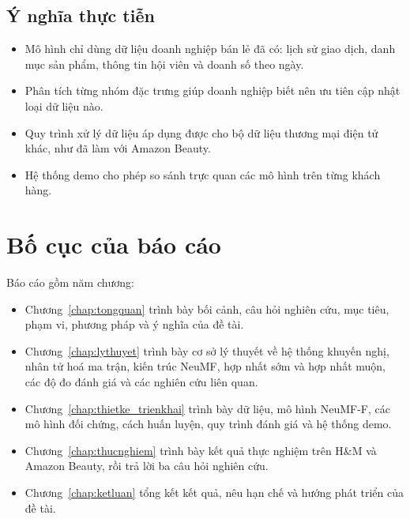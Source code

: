 \subsection{Ý nghĩa thực tiễn}
\label{subsec:ynghia_thucte}

\begin{itemize}
    \item Mô hình chỉ dùng dữ liệu doanh nghiệp bán lẻ đã có: lịch sử giao dịch, danh mục sản phẩm, thông tin hội viên và doanh số theo ngày.
    \item Phân tích từng nhóm đặc trưng giúp doanh nghiệp biết nên ưu tiên cập nhật loại dữ liệu nào.
    \item Quy trình xử lý dữ liệu áp dụng được cho bộ dữ liệu thương mại điện tử khác, như đã làm với Amazon Beauty.
    \item Hệ thống demo cho phép so sánh trực quan các mô hình trên từng khách hàng.
\end{itemize}

\section{Bố cục của báo cáo}
\label{sec:bocuc}

Báo cáo gồm năm chương:
\begin{itemize}
    \item Chương~\ref{chap:tongquan} trình bày bối cảnh, câu hỏi nghiên cứu, mục tiêu, phạm vi, phương pháp và ý nghĩa của đề tài.
    \item Chương~\ref{chap:lythuyet} trình bày cơ sở lý thuyết về hệ thống khuyến nghị, nhân tử hoá ma trận, kiến trúc NeuMF, hợp nhất sớm và hợp nhất muộn, các độ đo đánh giá và các nghiên cứu liên quan.
    \item Chương~\ref{chap:thietke_trienkhai} trình bày dữ liệu, mô hình NeuMF-F, các mô hình đối chứng, cách huấn luyện, quy trình đánh giá và hệ thống demo.
    \item Chương~\ref{chap:thucnghiem} trình bày kết quả thực nghiệm trên H\&M và Amazon Beauty, rồi trả lời ba câu hỏi nghiên cứu.
    \item Chương~\ref{chap:ketluan} tổng kết kết quả, nêu hạn chế và hướng phát triển của đề tài.
\end{itemize}
